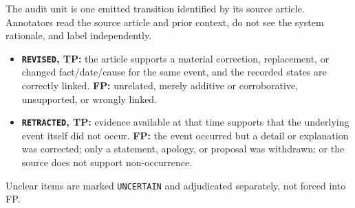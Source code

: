 \documentclass[journal]{IEEEtran}
\begin{document}
The audit unit is one emitted transition identified by its source article. Annotators read the source article and prior context, do not see the system rationale, and label independently.
\begin{itemize}
    \item \textbf{\texttt{REVISED}, TP:} the article supports a material correction, replacement, or changed fact/date/cause for the same event, and the recorded states are correctly linked. \textbf{FP:} unrelated, merely additive or corroborative, unsupported, or wrongly linked.
    \item \textbf{\texttt{RETRACTED}, TP:} evidence available at that time supports that the underlying event itself did not occur. \textbf{FP:} the event occurred but a detail or explanation was corrected; only a statement, apology, or proposal was withdrawn; or the source does not support non-occurrence.
\end{itemize}
Unclear items are marked \texttt{UNCERTAIN} and adjudicated separately, not forced into FP.



\end{document}
